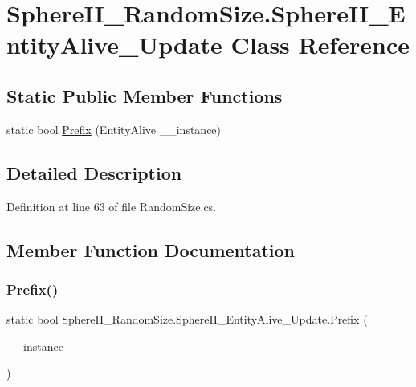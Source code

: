 \hypertarget{class_sphere_i_i___random_size_1_1_sphere_i_i___entity_alive___update}{}\section{Sphere\+I\+I\+\_\+\+Random\+Size.\+Sphere\+I\+I\+\_\+\+Entity\+Alive\+\_\+\+Update Class Reference}
\label{class_sphere_i_i___random_size_1_1_sphere_i_i___entity_alive___update}
\subsection*{Static Public Member Functions}
\begin{DoxyCompactItemize}
\item 
static bool \mbox{\hyperlink{class_sphere_i_i___random_size_1_1_sphere_i_i___entity_alive___update_ac259abec1202fdf4188a5dff0ff1df98}{Prefix}} (Entity\+Alive \+\_\+\+\_\+instance)
\end{DoxyCompactItemize}


\subsection{Detailed Description}


Definition at line 63 of file Random\+Size.\+cs.



\subsection{Member Function Documentation}
\mbox{\label{class_sphere_i_i___random_size_1_1_sphere_i_i___entity_alive___update_ac259abec1202fdf4188a5dff0ff1df98}} 
\subsubsection{\texorpdfstring{Prefix()}{Prefix()}}
{\footnotesize\ttfamily static bool Sphere\+I\+I\+\_\+\+Random\+Size.\+Sphere\+I\+I\+\_\+\+Entity\+Alive\+\_\+\+Update.\+Prefix (\begin{DoxyParamCaption}\item[{Entity\+Alive}]{\+\_\+\+\_\+instance }\end{DoxyParamCaption})\hspace{0.3cm}{\ttfamily [static]}}



